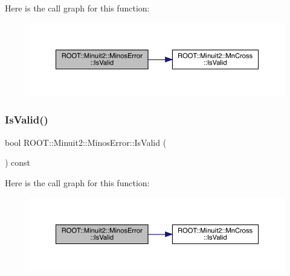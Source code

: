 Here is the call graph for this function\+:
\nopagebreak
\begin{figure}[H]
\begin{center}
\leavevmode
\includegraphics[width=350pt]{d2/dd1/classROOT_1_1Minuit2_1_1MinosError_af6b7accfe397a06417ecc1f989d82e00_cgraph}
\end{center}
\end{figure}
\mbox{\label{classROOT_1_1Minuit2_1_1MinosError_af6b7accfe397a06417ecc1f989d82e00}} 
\subsubsection{\texorpdfstring{IsValid()}{IsValid()}\hspace{0.1cm}{\footnotesize\ttfamily [3/3]}}
{\footnotesize\ttfamily bool R\+O\+O\+T\+::\+Minuit2\+::\+Minos\+Error\+::\+Is\+Valid (\begin{DoxyParamCaption}{ }\end{DoxyParamCaption}) const\hspace{0.3cm}{\ttfamily [inline]}}

Here is the call graph for this function\+:
\nopagebreak
\begin{figure}[H]
\begin{center}
\leavevmode
\includegraphics[width=350pt]{d2/dd1/classROOT_1_1Minuit2_1_1MinosError_af6b7accfe397a06417ecc1f989d82e00_cgraph}
\end{center}
\end{figure}
\mbox{\label{classROOT_1_1Minuit2_1_1MinosError_ac412aab9b0a59a427fbe7e3cfad47f0c}} 
